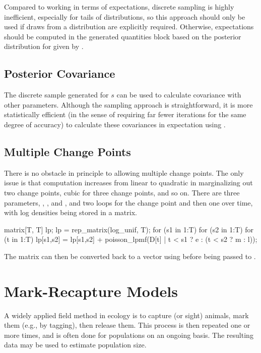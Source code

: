 Compared to working in terms of expectations, discrete sampling is
highly inefficient, especially for tails of distributions, so this
approach should only be used if draws from a distribution are
explicitly required.   Otherwise, expectations should be computed in
the generated quantities block based on the posterior distribution for
 given by .


\subsection{Posterior Covariance}

The discrete sample generated for $s$ can be used to calculate
covariance with other parameters.  Although the sampling approach is
straightforward, it is more statistically efficient (in the sense of
requiring far fewer iterations for the same degree of accuracy) to
calculate these covariances in expectation using .


\subsection{Multiple Change Points}

There is no obstacle in principle to allowing multiple change points.
The only issue is that computation increases from linear to quadratic
in marginalizing out two change points, cubic for three change points,
and so on.  There are three parameters, , , and
, and two loops for the change point and then one over time,
with log densities being stored in a matrix.
%
\begin{stancode}
matrix[T, T] lp;
lp = rep_matrix(log_unif, T);
for (s1 in 1:T)
  for (s2 in 1:T)
    for (t in 1:T)
      lp[s1,s2] = lp[s1,s2]
        + poisson_lpmf(D[t] | t < s1 ? e : (t < s2 ? m : l));
\end{stancode}
%
The matrix can then be converted back to a vector using
 before being passed to .

\section{Mark-Recapture Models}

A widely applied field method in ecology is to capture (or sight)
animals, mark them (e.g., by tagging), then release them.  This
process is then repeated one or more times, and is often done for
populations on an ongoing basis.  The resulting data may be used to
estimate population size.

